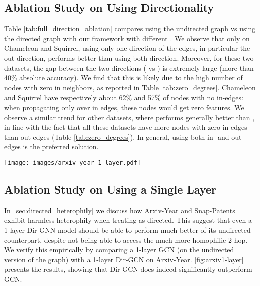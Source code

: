 \documentclass{article}
\theoremstyle{plain}
\theoremstyle{definition}
\theoremstyle{remark}
\begin{document}
\subsection{Ablation Study on Using Directionality}
Table \ref{tab:full_direction_ablation} compares using the undirected graph vs using the directed graph with our framework with different . We observe that only on Chameleon and Squirrel, using only one direction of the edges, in particular the out direction, performs better than using both direction. Moreover, for these two datasets, the gap between the two directions ( vs ) is extremely large (more than 40\% absolute accuracy). We find that this is likely due to the high number of nodes with zero in neighbors, as reported in Table \ref{tab:zero_degrees}. Chameleon and Squirrel have respectively about 62\% and 57\% of nodes with no in-edges: when propagating only over in edges, these nodes would get zero features. 
We observe a similar trend for other datasets, where  performs generally better than , in line with the fact that all these datasets have more nodes with zero in edges than out edges (Table \ref{tab:zero_degrees}). In general, using both in- and out- edges is the preferred solution.


\begin{figure*}
    \centering
    \texttt{[image: images/arxiv-year-1-layer.pdf]}
    \caption{Performance of GCN (on the undirected version of the graph) and Dir-GCN on Arxiv-Year when using only one layer. Remarkably, directionality yields significant benefits, even in the absence of access to the homophilic directed 2-hop. This is largely attributable to the harmless heterophily exhibited by the directed graph.}
    \label{fig:arxiv1-layer}
\end{figure*}

\subsection{Ablation Study on Using a Single Layer}
In~\cref{sec:directed_heterophily} we discuss how Arxiv-Year and Snap-Patents exhibit harmless heterophily when treating as directed. This suggest that even a 1-layer Dir-GNN model should be able to perform much better of its undirected counterpart, despite not being able to access the much more homophilic 2-hop. We verify this empirically by comparing a 1-layer GCN (on the undirected version of the graph) with a 1-layer Dir-GCN on Arxiv-Year. \cref{fig:arxiv1-layer} presents the results, showing that Dir-GCN does indeed significantly outperform GCN. 
\end{document}
